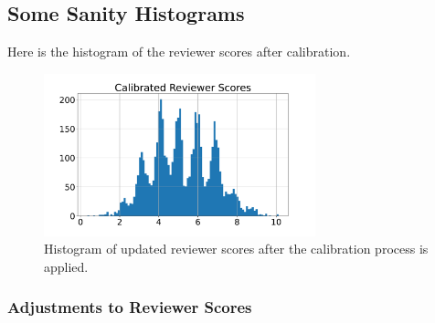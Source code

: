 \hypertarget{some-sanity-histograms}{%
\subsection{Some Sanity Histograms}\label{some-sanity-histograms}}

\begin{flushright}
\end{flushright}

Here is the histogram of the reviewer scores after calibration.

\begin{Shaded}
\begin{Highlighting}[]
\OperatorTok{=}\OperatorTok{=}
\OperatorTok{=}\OperatorTok{=}
\NormalTok{\_ }\OperatorTok{=}\NormalTok{)}
\OperatorTok{=}\OperatorTok{=}\NormalTok{)}
\end{Highlighting}
\end{Shaded}

\begin{figure}[htb]
\includegraphics[width=0.70\textwidth]{diagrams/neurips/calibrated-reviewer-scores.pdf}


\caption{Histogram of updated reviewer scores after the calibration process is applied.}
\label{calibrated-reviewer-scores}
\end{figure}

\hypertarget{adjustments-to-reviewer-scores}{%
\subsubsection{Adjustments to Reviewer
Scores}\label{adjustments-to-reviewer-scores}}

